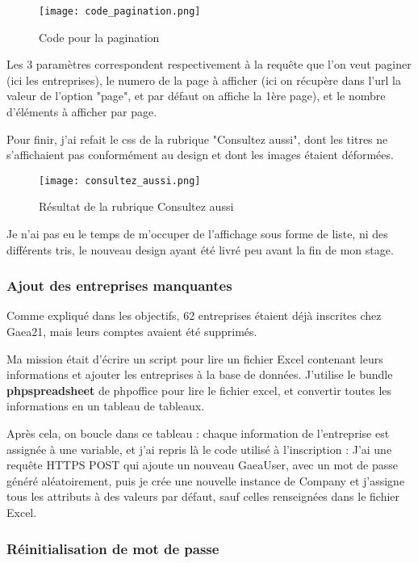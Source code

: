 \begin{figure}[H]
    \texttt{[image: code\_pagination.png]}
    \caption{Code pour la pagination}
\end{figure}

Les 3 paramètres correspondent respectivement à la requête que l'on veut paginer (ici les entreprises), 
le numero de la page à afficher (ici on récupère dans l'url la valeur de l'option "page", et par défaut on affiche la 1ère page),
et le nombre d'éléments à afficher par page.

Pour finir, j'ai refait le css de la rubrique "Consultez aussi", dont les titres ne s'affichaient pas conformément au design et dont les images étaient déformées.

\begin{figure}[H]
    \texttt{[image: consultez\_aussi.png]}
    \caption{Résultat de la rubrique Consultez aussi}
\end{figure}

Je n'ai pas eu le temps de m'occuper de l'affichage sous forme de liste, ni des différents tris, le nouveau design ayant été livré peu avant la fin de mon stage.

\subsubsection{Ajout des entreprises manquantes}


Comme expliqué dans les objectifs, 62 entreprises étaient déjà inscrites chez Gaea21, mais leurs comptes avaient été supprimés.

Ma mission était d'écrire un script pour lire un fichier Excel contenant leurs informations et ajouter les entreprises à la base de données.
J'utilise le bundle \textbf{phpspreadsheet} de phpoffice pour lire le fichier excel, et convertir toutes les informations en un tableau de tableaux.

Après cela, on boucle dans ce tableau : chaque information de l'entreprise est assignée à une variable, et j'ai repris là le code utilisé à l'inscription : 
J'ai une requête HTTPS POST qui ajoute un nouveau GaeaUser, avec un mot de passe généré aléatoirement, puis je crée une nouvelle instance de Company et j'assigne tous les attributs à des valeurs par défaut, sauf celles renseignées dans le fichier Excel.


\subsubsection{Réinitialisation de mot de passe}

